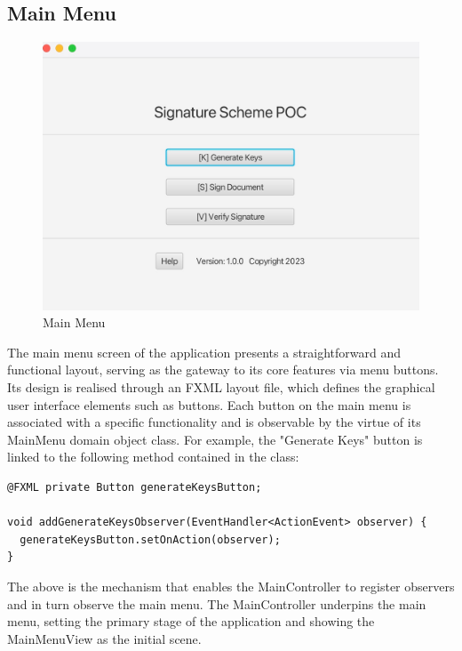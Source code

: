 \documentclass[]{final_report}
\theoremstyle{definition}
\begin{document}
\subsection{Main Menu}

\begin{figure}[H]
    \centering
    \includegraphics[scale=0.3]{poc_pictures/mainMenu.png}
    \caption{Main Menu}
\end{figure}
The main menu screen of the application presents a straightforward and functional layout, serving as the gateway to its core features via menu buttons. Its design is realised through an FXML layout file, which defines the graphical user interface elements such as buttons. Each button on the main menu is associated with a specific functionality and is observable by the virtue of its MainMenu domain object class. For example, the "Generate Keys" button is linked to the following method contained in the class:
\begin{lstlisting}[caption=Mechanism for registering observers]
@FXML private Button generateKeysButton;

void addGenerateKeysObserver(EventHandler<ActionEvent> observer) {
  generateKeysButton.setOnAction(observer);
}
\end{lstlisting}
The above is the mechanism that enables the MainController to register observers and in turn observe the main menu. The MainController underpins the main menu, setting the primary stage of the application and showing the MainMenuView as the initial scene.
\end{document}
